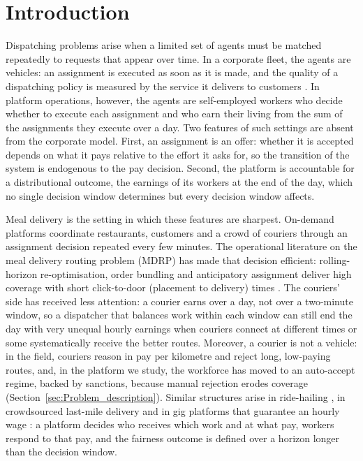 \documentclass[a4paper,11pt,review,3p,authoryear]{elsarticle}
\begin{document}
\section{Introduction} \label{sec:introduction}

Dispatching problems arise when a limited set of agents must be matched repeatedly to requests that appear over time. In a corporate fleet, the agents are vehicles: an assignment is executed as soon as it is made, and the quality of a dispatching policy is measured by the service it delivers to customers \citep{Dantzig1959,pillac2013review}. In platform operations, however, the agents are self-employed workers who decide whether to execute each assignment and who earn their living from the sum of the assignments they execute over a day. Two features of such settings are absent from the corporate model. First, an assignment is an offer: whether it is accepted depends on what it pays relative to the effort it asks for, so the transition of the system is endogenous to the pay decision. Second, the platform is accountable for a distributional outcome, the earnings of its workers at the end of the day, which no single decision window determines but every decision window affects.

Meal delivery is the setting in which these features are sharpest. On-demand platforms coordinate restaurants, customers and a crowd of couriers through an assignment decision repeated every few minutes. The operational literature on the meal delivery routing problem (MDRP) has made that decision efficient: rolling-horizon re-optimisation, order bundling and anticipatory assignment deliver high coverage with short click-to-door (placement to delivery) times \citep{reyes2018meal,yildiz2019provably,Ulmer2021}. The couriers' side has received less attention: a courier earns over a day, not over a two-minute window, so a dispatcher that balances work within each window can still end the day with very unequal hourly earnings when couriers connect at different times or some systematically receive the better routes. Moreover, a courier is not a vehicle: in the field, couriers reason in pay per kilometre and reject long, low-paying routes, and, in the platform we study, the workforce has moved to an auto-accept regime, backed by sanctions, because manual rejection erodes coverage (Section~\ref{sec:Problem_description}). Similar structures arise in ride-hailing \citep{lesmana2019balancing}, in crowdsourced last-mile delivery \citep{sobhanan2026equity} and in gig platforms that guarantee an hourly wage \citep{nair2022work4food}: a platform decides who receives which work and at what pay, workers respond to that pay, and the fairness outcome is defined over a horizon longer than the decision window.
\end{document}
